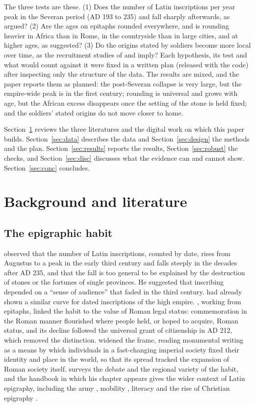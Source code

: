 The three tests are these. (1) Does the number of Latin inscriptions per year peak in the Severan period (AD 193 to 235) and fall sharply afterwards, as \citet{macmullen1982} argued? (2) Are the ages on epitaphs rounded everywhere, and is rounding heavier in Africa than in Rome, in the countryside than in large cities, and at higher ages, as \citet{duncanjones1977} suggested? (3) Do the origins stated by soldiers become more local over time, as the recruitment studies of \citet{forni1953} and \citet{mann1983} imply? Each hypothesis, its test and what would count against it were fixed in a written plan (released with the code) after inspecting only the structure of the data. The results are mixed, and the paper reports them as planned: the post-Severan collapse is very large, but the empire-wide peak is in the first century; rounding is universal and grows with age, but the African excess disappears once the setting of the stone is held fixed; and the soldiers' stated origins do not move closer to home.

Section~\ref{sec:lit} reviews the three literatures and the digital work on which this paper builds. Section~\ref{sec:data} describes the data and Section~\ref{sec:design} the methods and the plan. Section~\ref{sec:results} reports the results, Section~\ref{sec:robust} the checks, and Section~\ref{sec:disc} discusses what the evidence can and cannot show. Section~\ref{sec:conc} concludes.

\section{Background and literature}\label{sec:lit}
\subsection{The epigraphic habit}
\citet{macmullen1982} observed that the number of Latin inscriptions, counted by date, rises from Augustus to a peak in the early third century and falls steeply in the decades after AD 235, and that the fall is too general to be explained by the destruction of stones or the fortunes of single provinces. He suggested that inscribing depended on a ``sense of audience'' that faded in the third century. \citet{mrozek1973} had already shown a similar curve for dated inscriptions of the high empire. \citet{meyer1990}, working from epitaphs, linked the habit to the value of Roman legal status: commemoration in the Roman manner flourished where people held, or hoped to acquire, Roman status, and its decline followed the universal grant of citizenship in AD 212, which removed the distinction. \citet{woolf1996} widened the frame, reading monumental writing as a means by which individuals in a fast-changing imperial society fixed their identity and place in the world, so that its spread tracked the expansion of Roman society itself. \citet{beltran2014} surveys the debate and the regional variety of the habit, and the handbook in which his chapter appears \citep{bruun2014} gives the wider context of Latin epigraphy, including the army \citep{speidel2014}, mobility \citep{kolb2014}, literacy \citep{bodel2014} and the rise of Christian epigraphy \citep{mazzoleni2014}.

